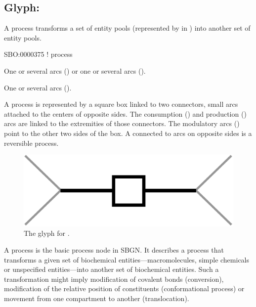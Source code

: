 

\subsection{Glyph: }
\label{sec:process}

A process transforms a set of entity pools (represented by  in \SBGNPDLone) into another set of entity pools.

\begin{glyphDescription}

\glyphSboTerm SBO:0000375 ! process

\glyphOrigin One or several  arcs () or one or several  arcs ().

\glyphTarget One or several  arcs ().

\glyphNode A process is represented by a square box linked to two connectors, small arcs attached to the centers of opposite sides. The consumption () and production () arcs are linked to the extremities of those connectors. The modulatory arcs () point to the other two sides of the box. A  connected to  arcs on opposite sides is a reversible process. 

\end{glyphDescription}

\begin{figure}[H]
  \centering
  \includegraphics[scale = 0.4]{images/process}
  \caption{The \PD glyph for .}
  \label{fig:process}
\end{figure}

A process is the basic process node in SBGN.  It describes a process that transforms a given set of biochemical entities---macromolecules, simple chemicals or unspecified entities---into another set of biochemical entities.  Such a transformation might imply modification of covalent bonds (conversion), modification of the relative position of constituents (conformational process) or movement from one compartment to another (translocation).

